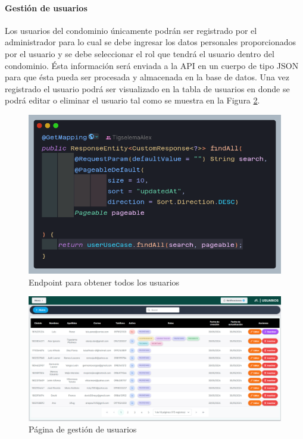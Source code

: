 \paragraph{Gestión de usuarios}

Los usuarios del condominio únicamente podrán ser registrado por el administrador para lo cual se debe ingresar los datos personales proporcionados por el usuario y se debe seleccionar el rol que tendrá el usuario dentro del condominio.
Ésta información será enviada a la API en un cuerpo de tipo JSON para que ésta pueda ser procesada y almacenada en la base de datos.
Una vez registrado el usuario podrá ser visualizado en la tabla de usuarios en donde se podrá editar o eliminar el usuario tal como se muestra en la Figura \ref{fig:sw-usuarios}.

\begin{figure}[H]
    \centering
    \includegraphics[width=1\textwidth]{resources/images/api-controller-findall}
    \caption{Endpoint para obtener todos los usuarios}
    \label{fig:api-findAll-controller}
\end{figure}

\begin{figure}[H]
    \centering
    \includegraphics[width=1\textwidth]{resources/images/sw-usuarios}
    \caption{Página de gestión de usuarios}
    \label{fig:sw-usuarios}
\end{figure}

